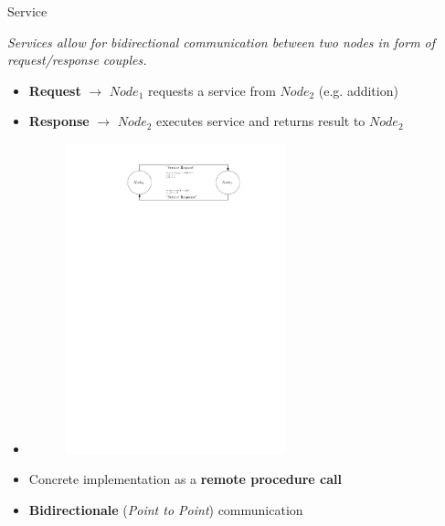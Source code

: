 \documentclass{beamer}
\begin{document}
\begin{frame}{Service}
	\begin{definition}[Service]
		\textit{Services allow for bidirectional communication between two nodes in form of request/response couples.}
	\end{definition}
	\begin{itemize}
		\item \textbf{Request} $\rightarrow$ $Node_1$ requests a service from $Node_2$ (e.g. addition)
		\item \textbf{Response} $\rightarrow$ $Node_2$ executes service and returns result to $Node_2$
		\item 
		\begin{figure}[H]
			\centering
			\includegraphics[width=0.6\textwidth]{ros-service.pdf}
			\label{fig:ros_service}
		\end{figure}
		\item Concrete implementation as a \textbf{remote procedure call}
		\item \textbf{Bidirectionale} (\textit{Point to Point}) communication
	\end{itemize}
\end{frame}
\end{document}
